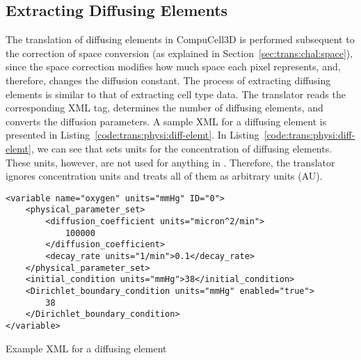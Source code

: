 \subsection{Extracting Diffusing Elements}\label{sec:trans:impl:dif}

The translation of diffusing elements in CompuCell3D is performed subsequent to the correction of space conversion (as explained in Section~\ref{sec:trans:chal:space}), since the space correction modifies how much space each pixel represents, and, therefore, changes the diffusion constant. The process of extracting diffusing elements is similar to that of extracting cell type data. The translator reads the corresponding XML tag, determines the number of diffusing elements, and converts the diffusion parameters. A sample XML for a diffusing element is presented in Listing~\ref{code:trans:physi:diff-elemt}. In Listing~\ref{code:trans:physi:diff-elemt}, we can see that \pscs sets units for the concentration of diffusing elements. These units, however, are not used for anything in \psc. Therefore, the translator ignores concentration units and treats all of them as arbitrary units (AU).
\begin{listing}[H]%
    \begin{verbatim}
<variable name="oxygen" units="mmHg" ID="0">
    <physical_parameter_set>
        <diffusion_coefficient units="micron^2/min">
            100000
        </diffusion_coefficient>
        <decay_rate units="1/min">0.1</decay_rate>  
    </physical_parameter_set>
    <initial_condition units="mmHg">38</initial_condition>
    <Dirichlet_boundary_condition units="mmHg" enabled="true">
        38
    </Dirichlet_boundary_condition>
</variable>        
    \end{verbatim}
    \caption{Example \pscs XML for a diffusing element}\label{code:trans:physi:diff-elemt}
\end{listing}


